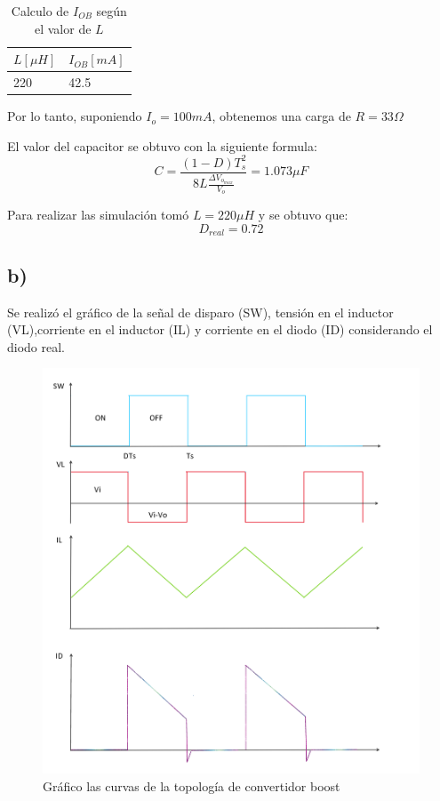 \documentclass[e4_tp1_main.tex]{subfiles}
\begin{document}
\begin{table}[H]
\centering
\begin{tabular}{|l|l|}
\hline
\multicolumn{1}{|c|}{$L [\mu H]$} & {$I_{OB} [mA]$}    \\ \hline
220                   & 42.5   \\ \hline

\end{tabular}
\caption{Calculo de $I_{OB}$ seg\'un el valor de $L$}
\label{tabla:calculo de Iob}
\end{table}

Por lo tanto, suponiendo $I_o=100mA$, obtenemos una carga de $R=33\Omega$



El valor del capacitor se obtuvo con la siguiente formula:
$$C=\frac{(1-D)T_{s}^{2}}{8L\frac{\Delta V_{o_{max}}}{V_o}}=1.073\mu F$$

Para realizar las simulaci\'on tom\'o  $L=220\mu H$ y se obtuvo que: 
$$D_{real}=0.72$$

\subsection*{b)}

Se realiz\'o el gr\'afico de la señal de disparo (SW), tensión en el inductor (VL),corriente en el inductor (IL) y corriente en el diodo (ID) considerando el diodo real. 

\begin{figure}[H]
  \centering
    \includegraphics[scale = 0.7]{Imagenes/punto2/Dibujo}
  \caption{Gr\'afico las curvas de la topolog\'ia de convertidor boost}
  \label{fig:dibujo}
\end{figure}
\end{document}
